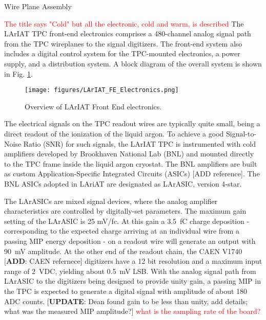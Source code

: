 \begin{subsubsection}{Wire Plane Assembly}
\begin{subsubsection}
\end{subsubsection}

\end{subsubsection}


\textcolor{red}{The title says "Cold" but all the electronic, cold and warm, is described}
The LArIAT TPC front-end electronics comprises a 480-channel analog signal path from the TPC wireplanes to the signal digitizers. The front-end system also includes a digital control system for the TPC-mounted electronics, a power supply, and a distribution system.
A block diagram of the overall system is shown in Fig. \ref{pic:FEelectronics}.

\begin{figure}[htbp]
 \centering
 \texttt{[image: figures/LArIAT\_FE\_Electronics.png]}
\caption{
Overview of LArIAT Front End electronics. 
} 
\label{pic:FEelectronics}
\end{figure}

The electrical signals on the TPC readout wires are typically quite small, being a direct readout of the ionization of the liquid argon. To achieve a good Signal-to-Noise Ratio (SNR) for such signals, the LArIAT TPC is instrumented with cold amplifiers developed by Brookhaven National Lab (BNL) and mounted directly to the TPC frame inside the liquid argon cryostat. The BNL amplifiers are built as custom Application-Specific Integrated Circuits (ASICs) [ADD reference]. The BNL ASICs adopted in LAriAT are designated as LArASIC, version 4-star.

The LArASICs are mixed signal devices, where the analog amplifier characteristics are controlled by digitally-set parameters. The maximum gain setting of the LArASIC is 25 mV/fc. At this gain a 3.5~fC charge deposition - corresponding to the expected charge arriving at an individual wire from a passing MIP energy deposition - on a readout wire will generate an output with 90~mV amplitude. At the other end of the readout chain, the CAEN V1740 [\textbf{ADD}: CAEN refernece] digitizers have a 12 bit resolution and a maximum input range of 2~VDC, yielding about 0.5~mV LSB. With the analog signal path from LArASIC to the digitizers being designed to provide unity gain, a passing MIP in the TPC is expected to generate a digital signal with amplitude of about 180 ADC counts.  [\textbf{UPDATE}: Dean found gain to be less than unity, add details; what was the measured MIP amplitude?] \textcolor{red}{what is the sampling rate of the board?}

